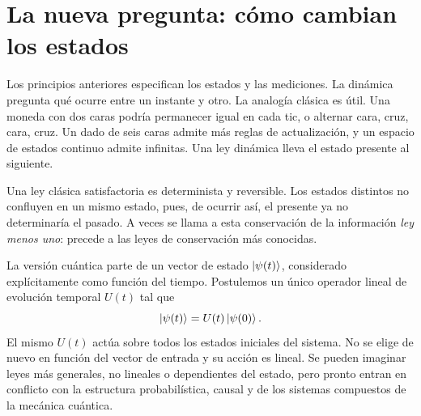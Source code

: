 \begin{classroomqa}
\end{classroomqa}

\begin{classroomqa}
\end{classroomqa}

\section{La nueva pregunta: cómo cambian los estados}

Los principios anteriores especifican los estados y las mediciones. La dinámica pregunta qué ocurre entre un instante y otro. La analogía clásica es útil. Una moneda con dos caras podría permanecer igual en cada tic, o alternar cara, cruz, cara, cruz. Un dado de seis caras admite más reglas de actualización, y un espacio de estados continuo admite infinitas. Una ley dinámica lleva el estado presente al siguiente.

Una ley clásica satisfactoria es determinista y reversible. Los estados distintos no confluyen en un mismo estado, pues, de ocurrir así, el presente ya no determinaría el pasado. A veces se llama a esta conservación de la información \emph{ley menos uno}: precede a las leyes de conservación más conocidas.

La versión cuántica parte de un vector de estado \(\left\lvert\psi(t)\right\rangle\), considerado explícitamente como función del tiempo. Postulemos un único operador lineal de evolución temporal \(U(t)\) tal que
\begin{equation}
\left\lvert\psi(t)\right\rangle=U(t)\left\lvert\psi(0)\right\rangle.
\label{eq:l4-time-development}
\end{equation}
El mismo \(U(t)\) actúa sobre todos los estados iniciales del sistema. No se elige de nuevo en función del vector de entrada y su acción es lineal. Se pueden imaginar leyes más generales, no lineales o dependientes del estado, pero pronto entran en conflicto con la estructura probabilística, causal y de los sistemas compuestos de la mecánica cuántica.

